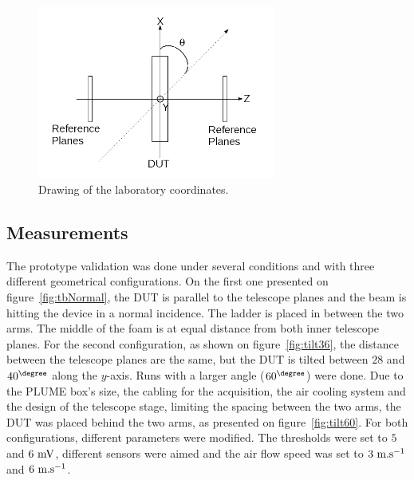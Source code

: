     \begin{figure}[!h]
      \centering
      \includegraphics[width = 0.7\textwidth]{Pictures/deformation/lab_frame.png}
      \caption{Drawing of the laboratory coordinates.}
      \label{fig:labCoordinates}
    \end{figure}

    \subsection{Measurements}

    The prototype validation was done under several conditions and with three different geometrical configurations.
    On the first one presented on figure~\ref{fig:tbNormal}, the \gls{DUT} is parallel to the telescope planes and the beam is hitting the device in a normal incidence.
    The ladder is placed in between the two arms.
    The middle of the foam is at equal distance from both inner telescope planes.
    For the second configuration, as shown on figure~\ref{fig:tilt36}, the distance between the telescope planes are the same, but the \gls{DUT} is tilted between $28$ and $40^{\degree}$ along the $y$-axis.
    Runs with a larger angle ($60^{\degree}$) were done.
    Due to the PLUME box's size, the cabling for the acquisition, the air cooling system and the design of the telescope stage, limiting the spacing between the two arms, the \gls{DUT} was placed behind the two arms, as presented on figure~\ref{fig:tilt60}.
    For both configurations, different parameters were modified.
    The thresholds were set to $5$ and $6~\rm{mV}$, different sensors were aimed and the air flow speed was set to $3~\rm{m.s}^{-1}$ and $6~\rm{m.s}^{-1}$.

